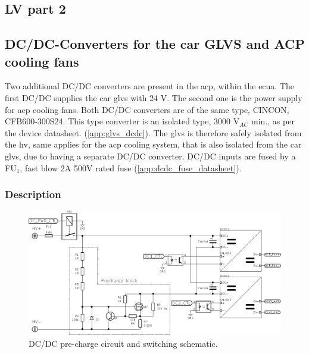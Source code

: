 \subsection{LV part 2}

\subsection {DC/DC-Converters for the car GLVS and ACP cooling fans}\label{subsec:glvs_dcdc}
Two additional DC/DC converters are present in the \gls{acp}, within the \gls{ecua}. The first DC/DC supplies the car \gls{glvs} with 24 V. The second one is the power supply for \gls{acp} cooling fans. Both DC/DC converters are of the same type, CINCON, CFB600-300S24. This type converter is an isolated type, 3000 V$_{AC}$ min., as per the device datasheet. (\ref{app:glvs_dcdc}). The \gls{glvs} is therefore safely isolated from the \gls{hv}, same applies for the \gls{acp} cooling system, that is also isolated from the car \gls{glvs}, due to having a separate DC/DC converter. DC/DC inputs are fused by a FU$_1$, fast blow 2A 500V rated fuse (\ref{app:dcdc_fuse_datasheet}).

\subsubsection{Description}

\begin{figure}[H]
	\centering
	\includegraphics[width=\textwidth,clip]{./img/ECUA_DCDC_PRECHARGE.pdf}
	\caption{DC/DC pre-charge circuit and switching schematic.}
	\label{fig:precharge_dcdc_sch}
\end{figure}

